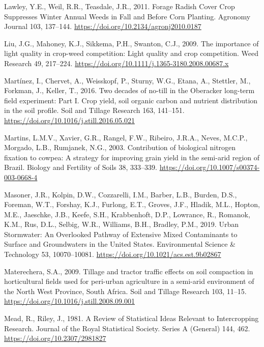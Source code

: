 \documentclass[
  12pt,
]{article}
\newlength{\cslhangindent}
\newlength{\cslentryspacingunit} %
\newenvironment{CSLReferences}[2] %
 {%
  \setlength{\parindent}{0pt}
  \ifodd #1
  \let\oldpar\par
  \def\par{\hangindent=\cslhangindent\oldpar}
  \fi
  \setlength{\parskip}{#2\cslentryspacingunit}
 }%
 {}
\begin{document}
\begin{CSLReferences}{1}{0}
\leavevmode{}%
Lawley, Y.E., Weil, R.R., Teasdale, J.R., 2011. Forage {Radish Cover Crop Suppresses Winter Annual Weeds} in {Fall} and {Before Corn Planting}. Agronomy Journal 103, 137--144. \url{https://doi.org/10.2134/agronj2010.0187}

\leavevmode{}%
Liu, J.G., Mahoney, K.J., Sikkema, P.H., Swanton, C.J., 2009. The importance of light quality in crop-weed competition: {Light} quality and crop competition. Weed Research 49, 217--224. \url{https://doi.org/10.1111/j.1365-3180.2008.00687.x}

\leavevmode{}%
Martínez, I., Chervet, A., Weisskopf, P., Sturny, W.G., Etana, A., Stettler, M., Forkman, J., Keller, T., 2016. Two decades of no-till in the {Oberacker} long-term field experiment: {Part I}. {Crop} yield, soil organic carbon and nutrient distribution in the soil profile. Soil and Tillage Research 163, 141--151. \url{https://doi.org/10.1016/j.still.2016.05.021}

\leavevmode{}%
Martins, L.M.V., Xavier, G.R., Rangel, F.W., Ribeiro, J.R.A., Neves, M.C.P., Morgado, L.B., Rumjanek, N.G., 2003. Contribution of biological nitrogen fixation to cowpea: A strategy for improving grain yield in the semi-arid region of {Brazil}. Biology and Fertility of Soils 38, 333--339. \url{https://doi.org/10.1007/s00374-003-0668-4}

\leavevmode{}%
Masoner, J.R., Kolpin, D.W., Cozzarelli, I.M., Barber, L.B., Burden, D.S., Foreman, W.T., Forshay, K.J., Furlong, E.T., Groves, J.F., Hladik, M.L., Hopton, M.E., Jaeschke, J.B., Keefe, S.H., Krabbenhoft, D.P., Lowrance, R., Romanok, K.M., Rus, D.L., Selbig, W.R., Williams, B.H., Bradley, P.M., 2019. Urban {Stormwater}: {An Overlooked Pathway} of {Extensive Mixed Contaminants} to {Surface} and {Groundwaters} in the {United States}. Environmental Science \& Technology 53, 10070--10081. \url{https://doi.org/10.1021/acs.est.9b02867}

\leavevmode{}%
Materechera, S.A., 2009. Tillage and tractor traffic effects on soil compaction in horticultural fields used for peri-urban agriculture in a semi-arid environment of the {North West Province}, {South Africa}. Soil and Tillage Research 103, 11--15. \url{https://doi.org/10.1016/j.still.2008.09.001}

\leavevmode{}%
Mead, R., Riley, J., 1981. A {Review} of {Statistical Ideas Relevant} to {Intercropping Research}. Journal of the Royal Statistical Society. Series A (General) 144, 462. \url{https://doi.org/10.2307/2981827}


\end{CSLReferences}
\end{document}
